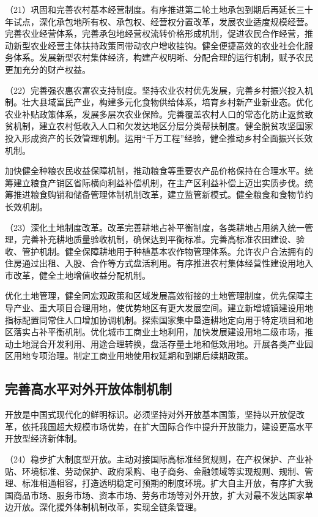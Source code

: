     （21）巩固和完善农村基本经营制度。有序推进第二轮土地承包到期后再延长三十年试点，深化承包地所有权、承包权、经营权分置改革，发展农业适度规模经营。完善农业经营体系，完善承包地经营权流转价格形成机制，促进农民合作经营，推动新型农业经营主体扶持政策同带动农户增收挂钩。健全便捷高效的农业社会化服务体系。发展新型农村集体经济，构建产权明晰、分配合理的运行机制，赋予农民更加充分的财产权益。

    （22）完善强农惠农富农支持制度。坚持农业农村优先发展，完善乡村振兴投入机制。壮大县域富民产业，构建多元化食物供给体系，培育乡村新产业新业态。优化农业补贴政策体系，发展多层次农业保险。完善覆盖农村人口的常态化防止返贫致贫机制，建立农村低收入人口和欠发达地区分层分类帮扶制度。健全脱贫攻坚国家投入形成资产的长效管理机制。运用“千万工程”经验，健全推动乡村全面振兴长效机制。

    加快健全种粮农民收益保障机制，推动粮食等重要农产品价格保持在合理水平。统筹建立粮食产销区省际横向利益补偿机制，在主产区利益补偿上迈出实质步伐。统筹推进粮食购销和储备管理体制机制改革，建立监管新模式。健全粮食和食物节约长效机制。

    （23）深化土地制度改革。改革完善耕地占补平衡制度，各类耕地占用纳入统一管理，完善补充耕地质量验收机制，确保达到平衡标准。完善高标准农田建设、验收、管护机制。健全保障耕地用于种植基本农作物管理体系。允许农户合法拥有的住房通过出租、入股、合作等方式盘活利用。有序推进农村集体经营性建设用地入市改革，健全土地增值收益分配机制。

    优化土地管理，健全同宏观政策和区域发展高效衔接的土地管理制度，优先保障主导产业、重大项目合理用地，使优势地区有更大发展空间。建立新增城镇建设用地指标配置同常住人口增加协调机制。探索国家集中垦造耕地定向用于特定项目和地区落实占补平衡机制。优化城市工商业土地利用，加快发展建设用地二级市场，推动土地混合开发利用、用途合理转换，盘活存量土地和低效用地。开展各类产业园区用地专项治理。制定工商业用地使用权延期和到期后续期政策。

    \subsection{完善高水平对外开放体制机制}

    开放是中国式现代化的鲜明标识。必须坚持对外开放基本国策，坚持以开放促改革，依托我国超大规模市场优势，在扩大国际合作中提升开放能力，建设更高水平开放型经济新体制。

    （24）稳步扩大制度型开放。主动对接国际高标准经贸规则，在产权保护、产业补贴、环境标准、劳动保护、政府采购、电子商务、金融领域等实现规则、规制、管理、标准相通相容，打造透明稳定可预期的制度环境。扩大自主开放，有序扩大我国商品市场、服务市场、资本市场、劳务市场等对外开放，扩大对最不发达国家单边开放。深化援外体制机制改革，实现全链条管理。

